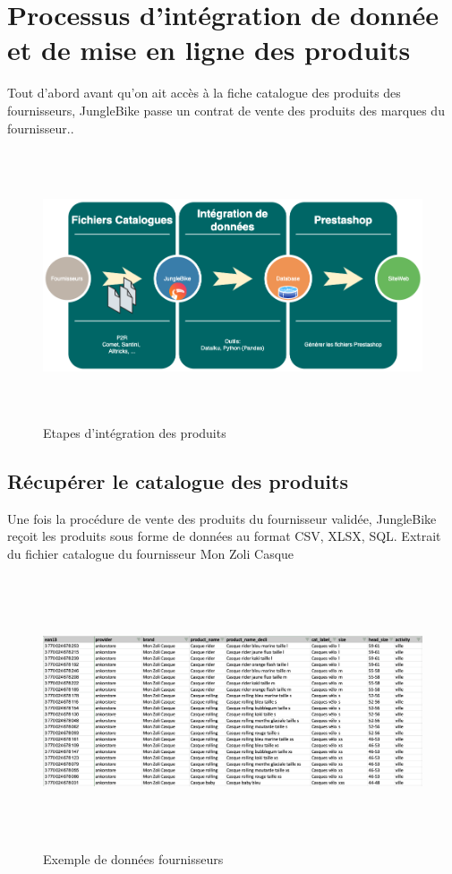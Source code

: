 \newpage

\section{Processus d’intégration de donnée et de mise en ligne des produits}
Tout d’abord avant qu’on ait accès à la fiche catalogue des produits des fournisseurs, JungleBike passe un contrat de vente des produits des marques du fournisseur.. 
\begin{figure}[h]
\begin{center}
\includegraphics[width=15cm,height=8cm]{images/integration_steps.png}
\caption[Etapes d'intégration des produits]{Etapes d'intégration des produits}
\label{monlabel}
\end{center}
\end{figure}

\subsection{Récupérer le catalogue des produits}
Une fois la procédure de vente des produits du fournisseur validée, JungleBike reçoit les produits sous forme de données au format CSV, XLSX, SQL.
Extrait du fichier catalogue du fournisseur Mon Zoli Casque
\begin{figure}[h]
\begin{center}
\includegraphics[width=15cm,height=8cm]{images/catalogue.png}
\caption[Exemple de données fournisseurs]{Exemple de données fournisseurs}
\label{monlabel}
\end{center}
\end{figure}
